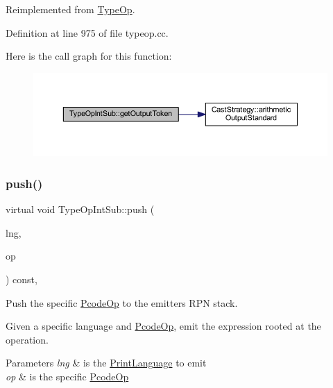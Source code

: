 Reimplemented from \mbox{\hyperlink{class_type_op_a7150ac93bb03a993735c829deb5237e7}{Type\+Op}}.



Definition at line 975 of file typeop.\+cc.

Here is the call graph for this function\+:
\nopagebreak
\begin{figure}[H]
\begin{center}
\leavevmode
\includegraphics[width=350pt]{class_type_op_int_sub_a7cba3a83ac6362edcb6d3c8120ac6cd5_cgraph}
\end{center}
\end{figure}
\mbox{\label{class_type_op_int_sub_a282e230df3a8e7d2a2e540f5cb5d76b1}} 
\subsubsection{\texorpdfstring{push()}{push()}}
{\footnotesize\ttfamily virtual void Type\+Op\+Int\+Sub\+::push (\begin{DoxyParamCaption}\item[{\mbox{\hyperlink{class_print_language}{Print\+Language}} $\ast$}]{lng,  }\item[{const \mbox{\hyperlink{class_pcode_op}{Pcode\+Op}} $\ast$}]{op }\end{DoxyParamCaption}) const\hspace{0.3cm}{\ttfamily [inline]}, {\ttfamily [virtual]}}



Push the specific \mbox{\hyperlink{class_pcode_op}{Pcode\+Op}} to the emitter\textquotesingle{}s R\+PN stack. 

Given a specific language and \mbox{\hyperlink{class_pcode_op}{Pcode\+Op}}, emit the expression rooted at the operation. 
\begin{DoxyParams}{Parameters}
{\em lng} & is the \mbox{\hyperlink{class_print_language}{Print\+Language}} to emit \\
\hline
{\em op} & is the specific \mbox{\hyperlink{class_pcode_op}{Pcode\+Op}} \\
\hline
\end{DoxyParams}


